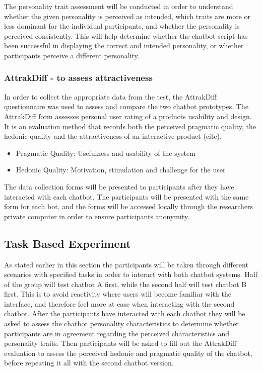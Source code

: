      The personality trait assessment will be conducted in order to understand whether the given personality is perceived as intended, which traits are more or less dominant for the individual participants, and whether the personality is perceived consistently. This will help determine whether the chatbot script has been successful in displaying the correct and intended personality, or whether participants perceive a different personality.
            
    \vspace{5mm} %
   
     \subsubsection{AttrakDiff - to assess attractiveness}
    
    In order to collect the appropriate data from the test, the AttrakDiff questionnaire was used to assess and compare the two chatbot prototypes. The AttrakDiff form assesses personal user rating of a products usability and design. It is an evaluation method that records both the perceived pragmatic quality, the hedonic quality and the attractiveness of an interactive product (cite).
    
        \begin{itemize}
            \item Pragmatic Quality: Usefulness and usability of the system
            \item Hedonic Quality: Motivation, stimulation and challenge for the user
        \end{itemize}
        
    The data collection forms will be presented to participants after they have interacted with each chatbot. The participants will be presented with the same form for each bot, and the forms will be accessed locally through the researchers private computer in order to ensure participants anonymity. 
    
   \subsection{Task Based Experiment}
   
   As stated earlier in this section the participants will be taken through different scenarios with specified tasks in order to interact with both chatbot systems. Half of the group will test chatbot A first, while the second half will test chatbot B first. This is to avoid reactivity where users will become familiar with the interface, and therefore feel more at ease when interacting with the second chatbot. After the participants have interacted with each chatbot they will be asked to assess the chatbot personality characteristics to determine whether participants are in agreement regarding the perceived characteristics and personality traits. Then participants will be asked to fill out the AttrakDiff evaluation to assess the perceived hedonic and pragmatic quality of the chatbot, before repeating it all with the second chatbot version.
   
